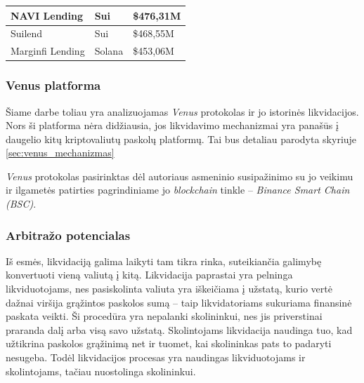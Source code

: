 \documentclass[]{VUMIFTemplateClass}
\begin{document}
\begin{table}[H]
\begin{tabular}{|l|p{7cm}|p{5cm}|}
  NAVI Lending              & Sui                                                                                   & \$476,31M \\ \hline
  Suilend                   & Sui                                                                                   & \$468,55M \\ \hline
  Marginfi Lending          & Solana                                                                                & \$453,06M \\ \hline
  \end{tabular}
  \label{tab:sample_table}
\end{table}

\subsubsection{Venus platforma}


Šiame darbe toliau yra analizuojamas \textit{Venus} protokolas ir jo istorinės likvidacijos. Nors ši platforma nėra didžiausia, jos likvidavimo mechanizmai yra panašūs į daugelio kitų kriptovaliutų paskolų platformų. Tai bus detaliau parodyta skyriuje \ref{sec:venus_mechanizmas}

\textit{Venus} protokolas pasirinktas dėl autoriaus asmeninio susipažinimo su jo veikimu ir ilgametės patirties pagrindiniame jo \textit{blockchain} tinkle – \textit{Binance Smart Chain (BSC)}.

\subsubsection{Arbitražo potencialas}
Iš esmės, likvidaciją galima laikyti tam tikra rinka, suteikiančia galimybę konvertuoti vieną valiutą į kitą. Likvidacija paprastai yra pelninga likviduotojams, nes pasiskolinta valiuta yra iškeičiama į užstatą, kurio vertė dažnai viršija grąžintos paskolos sumą – taip likvidatoriams sukuriama finansinė paskata veikti. Ši procedūra yra nepalanki skolininkui, nes jis priverstinai praranda dalį arba visą savo užstatą. Skolintojams likvidacija naudinga tuo, kad užtikrina paskolos grąžinimą net ir tuomet, kai skolininkas pats to padaryti nesugeba. Todėl likvidacijos procesas yra naudingas likviduotojams ir skolintojams, tačiau nuostolinga skolininkui.
\end{document}
